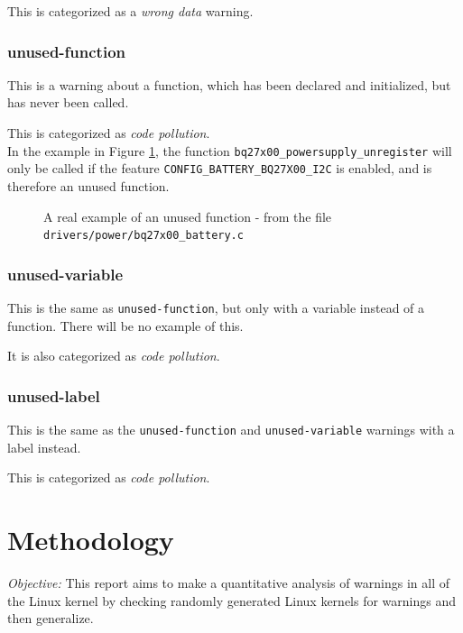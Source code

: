 \documentclass[a4paper,11pt]{report}
\newcommand{\figa}{
    \begin{figure}[!htpb]
    \centering
}
\newcommand{\figb}[2]{
    \caption{#1}
    \label{#2}
    \end{figure}
}
\begin{document}
This is categorized as a \emph{wrong data} warning.


            \subsection*{unused-function}
This is a warning about a function, which has been declared and initialized, 
but has never been called. 

This is categorized as \emph{code pollution}.
\\

In the example in Figure \ref{lst:unusedfuncreal}, the function 
\texttt{bq27x00\_powersupply\_unregister} will only be called if the feature 
\texttt{CONFIG\_BATTERY\_BQ27X00\_I2C} is enabled, and is therefore an 
unused function.

\figa
    
\figb{A real example of an unused function - from the file 
    \texttt{drivers/power/bq27x00\_battery.c}}{lst:unusedfuncreal}


            \subsection*{unused-variable}
This is the same as \texttt{unused-function}, but only with a variable instead 
of a function. There will be no example of this.

It is also categorized as \emph{code pollution}.


            \subsection*{unused-label}
This is the same as the \texttt{unused-function} and \texttt{unused-variable} 
warnings with a label instead.

This is categorized as \emph{code pollution}.




\newpage
\chapter{Methodology}

\emph{Objective:}
This report aims to make a quantitative analysis of warnings in all of the
Linux kernel by checking randomly generated Linux kernels for warnings and 
then generalize.
\end{document}
